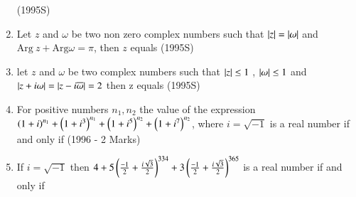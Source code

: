 \documentclass[journal]{IEEEtran}
\begin{document}
\begin{enumerate}[start=6]
\hfill{(1995S)}
\begin{enumerate}
\end{enumerate}
\item Let $z$ and $\omega$ be two non zero complex numbers such that $\left\vert z\right\vert=\left\vert\omega\right\vert$ and $\mathrm{Arg}\ z+\mathrm{Arg}\omega=\pi$, then $z$ equals 
\hfill{(1995S)}
\begin{enumerate}
\end{enumerate}
\item let $z$ and $\omega$ be two complex numbers such that $\left\vert z\right\vert\leq1$ , $\left\vert\omega\right\vert\leq1$ and $\left\vert z+i\omega\right\vert=\left\vert z-i\overline{\omega}\right\vert=2$ then z equals 
\hfill{(1995S)}
\begin{enumerate}
\end{enumerate}
\item For positive numbers $n_1,n_2$ the value of the expression $\left(1+i\right)^{n_1}+\left(1+i^3\right)^{n_1}+\left(1+i^5\right)^{n_2}+\left(1+i^7\right)^{n_2}$, where $i=\sqrt{-1}$ is a real number if and only if
\hfill{(1996 - 2 Marks)}
\begin{enumerate}
\end{enumerate}
\item If $i=\sqrt{-1}$ then $4+5\left(\frac{-1}{2}+\frac{i\sqrt{3}}{2}\right)^{334} + 3\left(\frac{-1}{2}+\frac{i\sqrt{3}}{2}\right)^{365}$ is a real number if and only if 

\end{enumerate}
\end{document}
